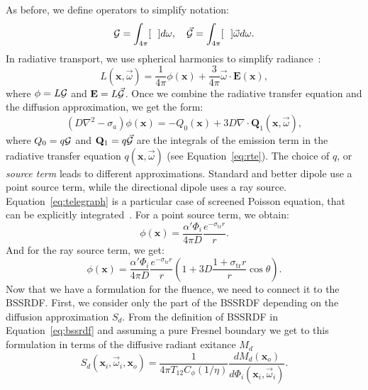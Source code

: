 As before, we define operators to simplify notation:
\begin{equation*}
\operator{G} = \int_{4\pi} [\ \ ] d\omega, \ \ \ \vec{\operator{G}} = \int_{4\pi} [\ \ ] \vec{\omega} d\omega.
\end{equation*}
In radiative transport, we use spherical harmonics to simplify radiance~\cite{Eason1978}:
\begin{equation*}
L(\mathbf{x}, \vec{\omega}) = \frac{1}{4\pi}\phi(\mathbf{x}) + \frac{3}{4\pi} \vec{\omega} \cdot \mathbf{E}(\mathbf{x}),
\end{equation*}
where $\phi = L \mathcal{G}$ and $\mathbf{E} = L \vec{\mathcal{G}}$. Once we combine the radiative transfer equation and the diffusion approximation, we get the form:
\begin{equation}
\label{eq:telegraph}
(D \nabla^2 - \sigma_a)\phi(\mathbf{x}) = -Q_0(\mathbf{x}) + 3D \nabla \cdot \mathbf{Q}_1(\mathbf{x}, \vec{\omega}),
\end{equation}
where $Q_0 = q \mathcal{G}$ and $\mathbf{Q}_1 = q \vec{\mathcal{G}}$ are the integrals of the emission term in the radiative transfer equation $q(\mathbf{x}, \vec{\omega})$ (see Equation~\ref{eq:rte}). The choice of $q$, or \emph{source term} leads to different approximations. Standard and better dipole use a point source term, while the directional dipole uses a ray source. Equation~\ref{eq:telegraph} is a particular case of screened Poisson equation, that can be explicitly integrated~\cite{Fetter2003}. For a point source term, we obtain:
\begin{equation}
\label{eq:fluencepoint}
\phi(\mathbf{x}) = \frac{\alpha' \Phi_i}{4 \pi D} \frac{e^{-\sigma_\text{tr} r}}{r}.
\end{equation}
And for the ray source term, we get:
\begin{equation}
\label{eq:fluenceray}
\phi(\mathbf{x}) = \frac{\alpha' \Phi_i}{4 \pi D} \frac{e^{-\sigma_\text{tr} r}}{r} \left(1 + 3D \frac{1 + \sigma_\text{tr} r}{r} \cos\theta \right).
\end{equation}
Now that we have a formulation for the fluence, we need to connect it to the BSSRDF. First, we consider only the part of the BSSRDF depending on the diffusion approximation $S_d$. From the definition of BSSRDF in Equation~\ref{eq:bssrdf} and assuming a pure Fresnel boundary we get to this formulation in terms of the diffusive radiant exitance $M_d$
\begin{equation*}
S_d(\mathbf{x}_i, \vec{\omega}_i, \mathbf{x}_o)  =  \frac{1}{4\pi T_{12}C_\phi(1/\eta)} \frac{d M_d(\mathbf{x}_o)}{d \Phi_i(\mathbf{x}_i, \vec{\omega}_i)} .
\end{equation*} 
